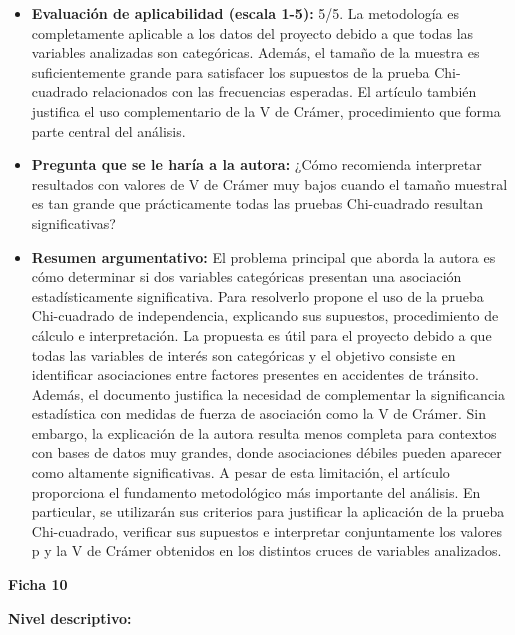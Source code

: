 \documentclass[12pt]{article}
\begin{document}
\begin{itemize}
    \item \textbf{Evaluación de aplicabilidad (escala 1-5):} 5/5. 
    La metodología es completamente aplicable a los datos del proyecto debido a que todas las variables analizadas son categóricas. 
    Además, el tamaño de la muestra es suficientemente grande para satisfacer los supuestos de la prueba Chi-cuadrado 
    relacionados con las frecuencias esperadas. El artículo también justifica el uso complementario de la V de Crámer, 
    procedimiento que forma parte central del análisis.

    \item \textbf{Pregunta que se le haría a la autora:} ¿Cómo recomienda interpretar resultados con valores de V de Crámer muy 
    bajos cuando el tamaño muestral es tan grande que prácticamente todas las pruebas Chi-cuadrado resultan significativas?

    \item \textbf{Resumen argumentativo:} El problema principal que aborda la autora es cómo determinar si dos variables 
    categóricas presentan una asociación estadísticamente significativa. Para resolverlo propone el uso de la prueba 
    Chi-cuadrado de independencia, explicando sus supuestos, procedimiento de cálculo e interpretación. La propuesta 
    es útil para el proyecto debido a que todas las variables de interés son categóricas y el objetivo 
    consiste en identificar asociaciones entre factores presentes en accidentes de tránsito. Además, el 
    documento justifica la necesidad de complementar la significancia estadística con medidas de fuerza de asociación como la 
    V de Crámer. Sin embargo, la explicación de la autora resulta menos completa para contextos con bases de datos muy grandes, 
    donde asociaciones débiles pueden aparecer como altamente significativas. A pesar de esta limitación, el artículo 
    proporciona el fundamento metodológico más importante del análisis. En particular, se utilizarán sus criterios para 
    justificar la aplicación de la prueba Chi-cuadrado, verificar sus supuestos e interpretar conjuntamente los valores p y la 
    V de Crámer obtenidos en los distintos cruces de variables analizados.\\
\end{itemize}
	
\textbf{Ficha 10}

\textbf{Nivel descriptivo:}
\end{document}
